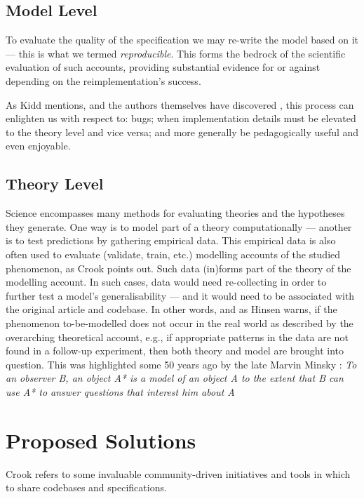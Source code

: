\documentclass[jou]{apa6}
\begin{document}
\subsection{Model Level}
To evaluate the quality of the specification we may re-write the model based on it --- this is what we termed \textit{reproducible}.
This forms the bedrock of the scientific evaluation of such accounts, providing substantial evidence for or against depending on the reimplementation's success.

As Kidd mentions, and the authors themselves have discovered \cite{cooper14}, this process can enlighten us with respect to: bugs; when implementation details must be elevated to the theory level and vice versa; and more generally be pedagogically useful and even enjoyable.

\subsection{Theory Level}
Science encompasses many methods for evaluating theories and the hypotheses they generate.
One way is to model part of a theory computationally --- another is to test predictions by gathering empirical data.
This empirical data is also often used to evaluate (validate, train, etc.) modelling accounts of the studied phenomenon, as Crook points out. 
Such data (in)forms part of the theory of the modelling account.
In such cases, data would need re-collecting in order to further test a model's generalisability --- and it would need to be associated with the original article and codebase. 
In other words, and as Hinsen warns, if the phenomenon to-be-modelled does not occur in the real world as described by the overarching theoretical account, e.g., if appropriate patterns in the data are not found in a follow-up experiment, then both theory and model are brought into question. This was highlighted some 50 years ago by the late Marvin Minsky \cite{Minsky:1965}: 
{\it To an observer B, an object A* is a model of an object A to the extent that B can use A* to answer questions that interest him about A}


\section{Proposed Solutions}

Crook refers to some invaluable community-driven initiatives and tools in which to share codebases and specifications.
\end{document}
